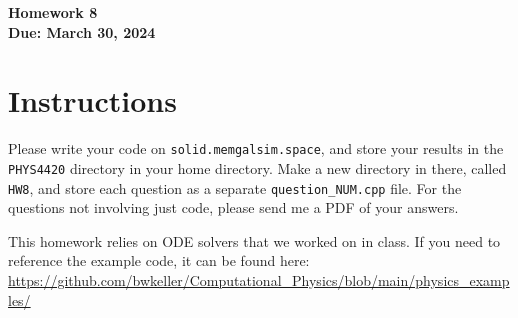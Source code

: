 \documentclass[11pt]{article}
\begin{document}
\begin{center}
\textbf{\Large Homework 8}\\
\textbf{Due: March 30, 2024}\\
\end{center}
\section*{Instructions}
Please write your code on \texttt{solid.memgalsim.space}, and store your results
in the \texttt{PHYS4420} directory in your home directory.  Make a new directory
in there, called \texttt{HW8}, and store each question as a separate
\texttt{question\_NUM.cpp} file.  For the questions not involving just code,
please send me a PDF of your answers.

This homework relies on ODE solvers that we worked on in class.  If you need to
reference the example code, it can be found here: \\
\url{https://github.com/bwkeller/Computational_Physics/blob/main/physics_examples/}
\end{document}
